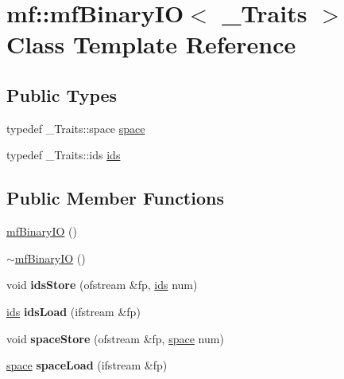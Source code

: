 \hypertarget{classmf_1_1mfBinaryIO}{
\section{mf::mfBinaryIO$<$ \_\-Traits $>$ Class Template Reference}
\label{classmf_1_1mfBinaryIO}
}
\subsection*{Public Types}
\begin{DoxyCompactItemize}
\item 
typedef \_\-Traits::space \hyperlink{classmf_1_1mfBinaryIO_a90e373b679656da911855f0f855f8dc8}{space}
\item 
typedef \_\-Traits::ids \hyperlink{classmf_1_1mfBinaryIO_a2e229a9a1a64191bfe2bda80a9328714}{ids}
\end{DoxyCompactItemize}
\subsection*{Public Member Functions}
\begin{DoxyCompactItemize}
\item 
\hyperlink{classmf_1_1mfBinaryIO_aa9f709f13c77d6bd68dd47fa94eab10d}{mfBinaryIO} ()
\item 
\hyperlink{classmf_1_1mfBinaryIO_a78f8441d13f96990a219026e53fe23a5}{$\sim$mfBinaryIO} ()
\item 
\hypertarget{classmf_1_1mfBinaryIO_a57738ff8f339dd322aee5afc15bb28c9}{
void {\bfseries idsStore} (ofstream \&fp, \hyperlink{classmf_1_1mfBinaryIO_a2e229a9a1a64191bfe2bda80a9328714}{ids} num)}
\label{classmf_1_1mfBinaryIO_a57738ff8f339dd322aee5afc15bb28c9}

\item 
\hypertarget{classmf_1_1mfBinaryIO_a6d8e8e0a30cff9cf1157162ef67944eb}{
\hyperlink{classmf_1_1mfBinaryIO_a2e229a9a1a64191bfe2bda80a9328714}{ids} {\bfseries idsLoad} (ifstream \&fp)}
\label{classmf_1_1mfBinaryIO_a6d8e8e0a30cff9cf1157162ef67944eb}

\item 
\hypertarget{classmf_1_1mfBinaryIO_a7761f8e596d29208644a41646a9e05a9}{
void {\bfseries spaceStore} (ofstream \&fp, \hyperlink{classmf_1_1mfBinaryIO_a90e373b679656da911855f0f855f8dc8}{space} num)}
\label{classmf_1_1mfBinaryIO_a7761f8e596d29208644a41646a9e05a9}

\item 
\hypertarget{classmf_1_1mfBinaryIO_a7b12da467f9e18e1b7858ff26de79a63}{
\hyperlink{classmf_1_1mfBinaryIO_a90e373b679656da911855f0f855f8dc8}{space} {\bfseries spaceLoad} (ifstream \&fp)}
\label{classmf_1_1mfBinaryIO_a7b12da467f9e18e1b7858ff26de79a63}

\end{DoxyCompactItemize}
